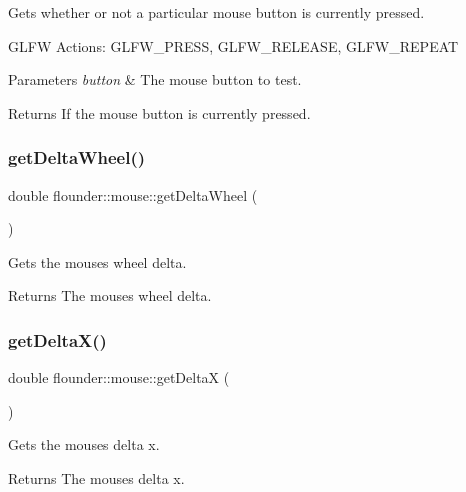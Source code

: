 Gets whether or not a particular mouse button is currently pressed. 

G\+L\+FW Actions\+: G\+L\+F\+W\+\_\+\+P\+R\+E\+SS, G\+L\+F\+W\+\_\+\+R\+E\+L\+E\+A\+SE, G\+L\+F\+W\+\_\+\+R\+E\+P\+E\+AT


\begin{DoxyParams}{Parameters}
{\em button} & The mouse button to test. \\
\hline
\end{DoxyParams}
\begin{DoxyReturn}{Returns}
If the mouse button is currently pressed. 
\end{DoxyReturn}
\mbox{\label{classflounder_1_1mouse_aca4c4c0498247db6fafef3ad7fb7a729}} 
\subsubsection{\texorpdfstring{get\+Delta\+Wheel()}{getDeltaWheel()}}
{\footnotesize\ttfamily double flounder\+::mouse\+::get\+Delta\+Wheel (\begin{DoxyParamCaption}{ }\end{DoxyParamCaption})}



Gets the mouses wheel delta. 

\begin{DoxyReturn}{Returns}
The mouses wheel delta. 
\end{DoxyReturn}
\mbox{\label{classflounder_1_1mouse_ac4109903ff369214a5b6466a014d04dd}} 
\subsubsection{\texorpdfstring{get\+Delta\+X()}{getDeltaX()}}
{\footnotesize\ttfamily double flounder\+::mouse\+::get\+DeltaX (\begin{DoxyParamCaption}{ }\end{DoxyParamCaption})}



Gets the mouses delta x. 

\begin{DoxyReturn}{Returns}
The mouses delta x. 
\end{DoxyReturn}
\mbox{\label{classflounder_1_1mouse_a97c8ce905344917d6b57d9c0c0ea532a}} 

